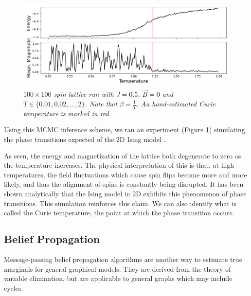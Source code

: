 \documentclass{article}
\begin{document}
\begin{figure}
    \includegraphics[width=\textwidth]{report_mcmc_phase}
    \caption{\textit{
        $100 \times 100$ spin lattice run with $J=0.5$, $\vec{B} = 0$ and 
        $T \in \{0.01, 0.02, \dots, 2\}$. 
        Note that $\beta = \frac{1}{T}$. 
        An hand-estimated Curie temperature is marked in red. 
    }}
    \label{fig:mcmc_phase}
\end{figure}

Using this MCMC inference scheme, we ran an experiment (Figure 
\ref{fig:mcmc_phase}) simulating the phase transitions expected of the 2D 
Ising model \cite{peirerls1936}. 

As seen, the energy and magnetization of the lattice both degenerate to zero 
as the temperature increases. 
The physical interpretation of this is that, at high temperatures, the field 
fluctuations which cause spin flips become more and more likely, and thus 
the alignment of spins is constantly being disrupted. 
It has been shown analytically that the Ising model in 2D exhibits this 
phenomenon of phase transitions. 
This simulation reinforces this claim. 
We can also identify what is called the Curie temperature, the point at which 
the phase transition occurs. 

%
%
%
%
%
\subsection{Belief Propagation}
%
%
%
%
%
Message-passing belief propagation algorithms are another way to estimate true 
marginals for general graphical models. 
They are derived from the theory of variable elimination, but are applicable to 
general graphs which may include cycles. 
\end{document}
